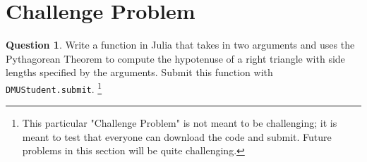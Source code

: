 \documentclass{article}
\theoremstyle{definition}
\newtheorem{question}[thm]{Question}
\begin{document}


\section{Challenge Problem}

\begin{question}
    Write a function in Julia that takes in two arguments and uses the Pythagorean Theorem to compute the hypotenuse of a right triangle with side lengths specified by the arguments. Submit this function with \texttt{DMUStudent.submit}. \footnote{This particular "Challenge Problem" is not meant to be challenging; it is meant to test that everyone can download the code and submit. Future problems in this section will be quite challenging.}
\end{question}
\end{document}
